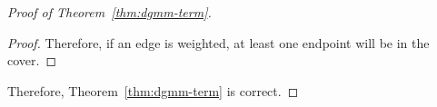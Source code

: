 \begin{proof}[Proof of Theorem~\ref{thm:dgmm-term}]
\begin{proof}
Therefore, if an edge is weighted, at least one endpoint will be in the cover.
\end{proof}

Therefore, Theorem~\ref{thm:dgmm-term} is correct.
\end{proof}
